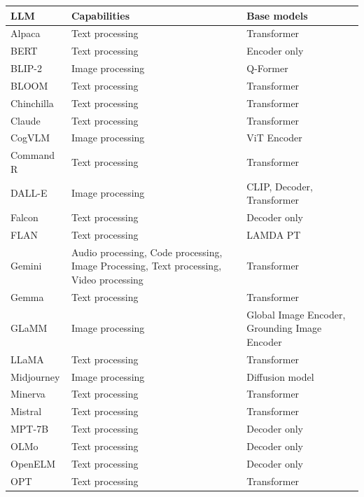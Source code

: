 \begin{table}[H]
    \footnotesize 
    \centering
    \begin{tabular}{|>{\raggedright\arraybackslash}p{4cm}|>{\raggedright\arraybackslash}p{4cm}|>{\raggedright\arraybackslash}p{4cm}|}
        \hline
        LLM & Capabilities & Base models \\ \hline
        Alpaca & Text processing & Transformer\\ \hline
        BERT & Text processing & Encoder only \\ \hline
        BLIP-2 & Image processing & Q-Former \\ \hline
        BLOOM & Text processing & Transformer \\ \hline
        Chinchilla & Text processing & Transformer \\ \hline
        Claude & Text processing & Transformer \\ \hline
        CogVLM & Image processing & ViT Encoder \\ \hline
        Command R & Text processing & Transformer \\ \hline
        DALL-E & Image processing & CLIP, Decoder, Transformer \\ \hline
        Falcon & Text processing & Decoder only \\ \hline
        FLAN & Text processing & LAMDA PT \\ \hline
        Gemini & Audio processing, Code processing, Image Processing, Text processing, Video processing & Transformer\\ \hline
        Gemma & Text processing & Transformer \\ \hline
        GLaMM & Image processing & Global Image Encoder, Grounding Image Encoder \\ \hline
        LLaMA & Text processing & Transformer \\ \hline
        Midjourney & Image processing & Diffusion model  \\ \hline
        Minerva & Text processing & Transformer \\ \hline
        Mistral & Text processing & Transformer \\ \hline
        MPT-7B & Text processing & Decoder only \\ \hline
        OLMo & Text processing & Decoder only \\ \hline
        OpenELM & Text processing & Decoder only \\ \hline
        OPT & Text processing & Transformer \\ \hline

\end{tabular}
\end{table}
